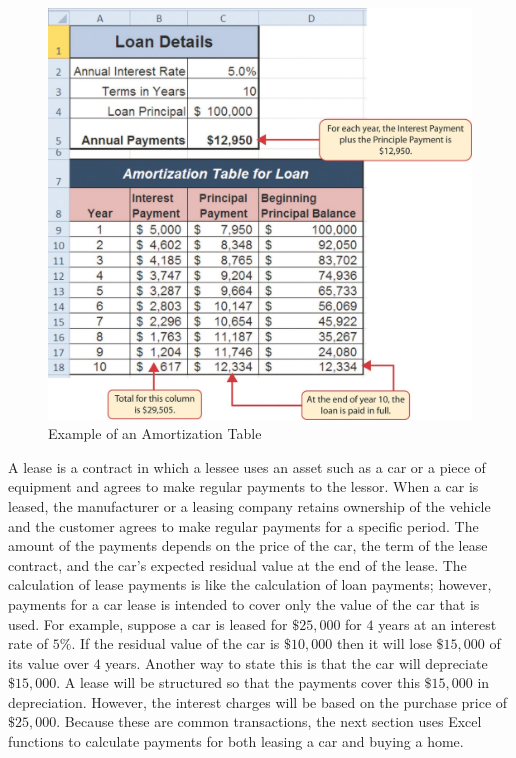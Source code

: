 \begin{figure}[H]
	\centering
	\includegraphics[width=\maxwidth{.95\linewidth}]{gfx/ch02_fig29}
	\caption{Example of an Amortization Table}
	\label{02:fig29}
\end{figure}

A lease is a contract in which a lessee uses an asset such as a car or a piece of equipment and agrees to make regular payments to the lessor. When a car is leased, the manufacturer or a leasing company retains ownership of the vehicle and the customer agrees to make regular payments for a specific period. The amount of the payments depends on the price of the car, the term of the lease contract, and the car's expected residual value at the end of the lease. The calculation of lease payments is like the calculation of loan payments; however, payments for a car lease is intended to cover only the value of the car that is used. For example, suppose a car is leased for $ \$25,000 $ for $ 4 $ years at an interest rate of $ 5\% $. If the residual value of the car is $ \$10,000 $ then it will lose $ \$15,000 $ of its value over $ 4 $ years. Another way to state this is that the car will depreciate $ \$15,000 $. A lease will be structured so that the payments cover this $ \$15,000 $ in depreciation. However, the interest charges will be based on the purchase price of $ \$25,000 $. Because these are common transactions, the next section uses Excel functions to calculate payments for both leasing a car and buying a home.

